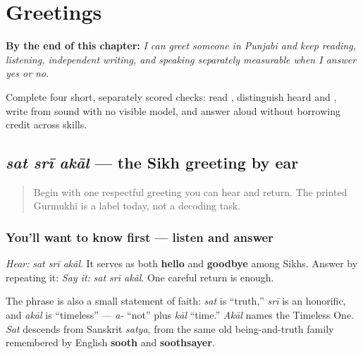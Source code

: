 
\chapter{Greetings}
\label{ch:greetings}

\begin{chapteropening}
\textbf{By the end of this chapter:} \emph{I can greet someone in Punjabi and keep reading, listening, independent writing, and speaking separately measurable when I answer yes or no.}

Complete four short, separately scored checks: read , distinguish heard  and , write  from sound with no visible model, and answer aloud without borrowing credit across skills.
\end{chapteropening}

\section[\texorpdfstring{\pa{ਸਤਿ} \pa{ਸ੍ਰੀ} \pa{ਅਕਾਲ} (sat srī akāl)}{ਸਤਿ ਸ੍ਰੀ ਅਕਾਲ (sat srī akāl)}]{\emph{sat srī akāl} — the Sikh greeting by ear}

\label{lesson:PA-C01-sat-sri-akal}



\begin{quote}
Begin with one respectful greeting you can hear and return. The printed Gurmukhi is a label today, not a decoding task.
\end{quote}

\subsection*{You'll want to know first — listen and answer}
\emph{Hear:} \emph{sat srī akāl}. It serves as both \textbf{hello} and \textbf{goodbye} among Sikhs. Answer by repeating it: \emph{Say it:} \emph{sat srī akāl}. One careful return is enough.

The phrase is also a small statement of faith: \emph{sat} is “truth,” \emph{srī} is an honorific, and \emph{akāl} is “timeless” — \emph{a-} “not” plus \emph{kāl} “time.” \emph{Akāl} names the Timeless One. \emph{Sat} descends from Sanskrit \emph{satya}, from the same old being-and-truth family remembered by English \textbf{sooth} and \textbf{soothsayer}.

